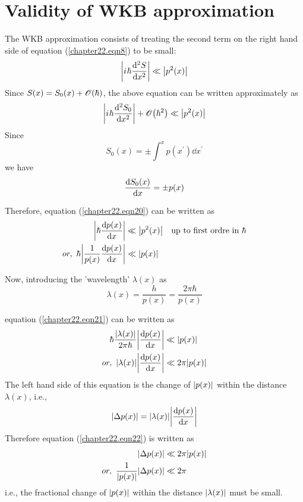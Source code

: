 \section{Validity of WKB approximation}
The WKB approximation consists of treating the second term on the right hand side of equation (\ref{chapter22.eqn8}) to be small:
\begin{equation}
\label{chapter22.eqn19}
\abs{{i\mkern1mu} \hbar \dv[2]{S}{x}} \ll \abs{p^2(x)}
\end{equation}
Since $S(x) = S_0(x) + \order{\hbar}$, the above equation can be written approximately as
\begin{equation}
\label{chapter22.eqn20}
\abs{\iu \hbar \dv[2]{S_0}{x}} + \order{\hbar^2} \ll \abs{p^2(x)}
\end{equation}
Since
\begin{equation}
S_0(x) = \pm \int^{x} p(x^\prime) \dd{x^\prime}
\end{equation}
we have
\begin{equation}
\dv{S_0(x)}{x} = \pm p(x)
\end{equation}

Therefore, equation (\ref{chapter22.eqn20}) can be written as
\begin{align}
\abs{\hbar\dv{p(x)}{x}} &\ll \abs{p^2(x)} \quad \text{up to first ordre in } \hbar \nonumber \\
\label{chapter22.eqn21}
or, \ \hbar \abs{\frac{1}{p(x)} \dv{p(x)}{x}} &\ll  \abs{p(x)}
\end{align}

Now, introducing the 'wavelength' $\lambda(x)$ as 
\begin{equation}
\lambda(x) = \frac{h}{p(x)} = \frac{2\pi \hbar}{p(x)}
\end{equation}

equation (\ref{chapter22.eqn21}) can be written as
\begin{align}
\hbar \frac{\abs{\lambda(x)}}{2 \pi \hbar} \abs{\dv{p(x)}{x}} &\ll \abs{p(x)} \nonumber \\
\label{chapter22.eqn22}
or, \ \abs{\lambda(x)} \abs{\dv{p(x)}{x}} &\ll 2 \pi \abs{p(x)}
\end{align}
The left hand side of this equation is the change of $\abs{p(x)}$ within the distance $\lambda(x)$, i.e.,
\begin{equation*}
\abs{\Delta p(x)} = \abs{\lambda(x)} \abs{\dv{p(x)}{x}}
\end{equation*}
Therefore equation (\ref{chapter22.eqn22}) is written as
\begin{align}
	\abs{\Delta p(x)} &\ll 2\pi \abs{p(x)} \nonumber \\
	\label{chapter22.eqn23}
	or, \ \frac{1}{\abs{p(x)}} \abs{\Delta p(x)} &\ll 2 \pi
\end{align}
i.e., the fractional change of $\abs{p(x)}$ within the distance $\abs{\lambda(x)}$ must be small.\\

